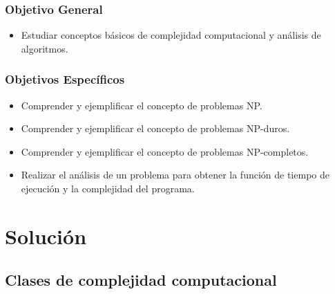 \subsubsection{Objetivo General}
\begin{itemize}
\item Estudiar conceptos básicos de complejidad computacional y análisis de
algoritmos.
\end{itemize}

\subsubsection{Objetivos Específicos}
\begin{itemize}
\item Comprender y ejemplificar el concepto de problemas NP.
\item Comprender y ejemplificar el concepto de problemas NP-duros.
\item Comprender y ejemplificar el concepto de problemas NP-completos.
\item Realizar el análisis de un problema para obtener la función de tiempo de ejecución y la complejidad del programa. 
\end{itemize}


 


\section{Solución}

\subsection{Clases de complejidad computacional}


